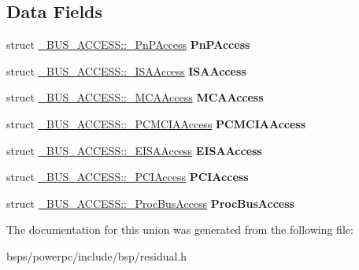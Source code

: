 \subsection*{Data Fields}
\begin{DoxyCompactItemize}
\item 
\mbox{\label{union__BUS__ACCESS_aade8c17625afa42eb6adc51912aeeceb}} 
struct \mbox{\hyperlink{struct__BUS__ACCESS_1_1__PnPAccess}{\+\_\+\+B\+U\+S\+\_\+\+A\+C\+C\+E\+S\+S\+::\+\_\+\+Pn\+P\+Access}} {\bfseries Pn\+P\+Access}
\item 
\mbox{\label{union__BUS__ACCESS_aa9e8a34f2ba85e09a2d68e965255497a}} 
struct \mbox{\hyperlink{struct__BUS__ACCESS_1_1__ISAAccess}{\+\_\+\+B\+U\+S\+\_\+\+A\+C\+C\+E\+S\+S\+::\+\_\+\+I\+S\+A\+Access}} {\bfseries I\+S\+A\+Access}
\item 
\mbox{\label{union__BUS__ACCESS_a750c14948d92d861e57fe36728748e4f}} 
struct \mbox{\hyperlink{struct__BUS__ACCESS_1_1__MCAAccess}{\+\_\+\+B\+U\+S\+\_\+\+A\+C\+C\+E\+S\+S\+::\+\_\+\+M\+C\+A\+Access}} {\bfseries M\+C\+A\+Access}
\item 
\mbox{\label{union__BUS__ACCESS_a845a642c3ba7079f263272c79c1a2a42}} 
struct \mbox{\hyperlink{struct__BUS__ACCESS_1_1__PCMCIAAccess}{\+\_\+\+B\+U\+S\+\_\+\+A\+C\+C\+E\+S\+S\+::\+\_\+\+P\+C\+M\+C\+I\+A\+Access}} {\bfseries P\+C\+M\+C\+I\+A\+Access}
\item 
\mbox{\label{union__BUS__ACCESS_a556826ddfea59e9dc81cdf20e4d1822f}} 
struct \mbox{\hyperlink{struct__BUS__ACCESS_1_1__EISAAccess}{\+\_\+\+B\+U\+S\+\_\+\+A\+C\+C\+E\+S\+S\+::\+\_\+\+E\+I\+S\+A\+Access}} {\bfseries E\+I\+S\+A\+Access}
\item 
\mbox{\label{union__BUS__ACCESS_a8ebec652f8a2b80ff118ea2bfd0421cd}} 
struct \mbox{\hyperlink{struct__BUS__ACCESS_1_1__PCIAccess}{\+\_\+\+B\+U\+S\+\_\+\+A\+C\+C\+E\+S\+S\+::\+\_\+\+P\+C\+I\+Access}} {\bfseries P\+C\+I\+Access}
\item 
\mbox{\label{union__BUS__ACCESS_af6186bbfcdc8d12a7ec553b6756bcc06}} 
struct \mbox{\hyperlink{struct__BUS__ACCESS_1_1__ProcBusAccess}{\+\_\+\+B\+U\+S\+\_\+\+A\+C\+C\+E\+S\+S\+::\+\_\+\+Proc\+Bus\+Access}} {\bfseries Proc\+Bus\+Access}
\end{DoxyCompactItemize}


The documentation for this union was generated from the following file\+:\begin{DoxyCompactItemize}
\item 
bsps/powerpc/include/bsp/residual.\+h\end{DoxyCompactItemize}
